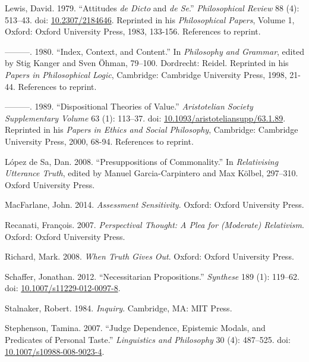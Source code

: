 \documentclass[
  10pt,
  letterpaper,
  DIV=11,
  numbers=noendperiod,
  twoside]{scrartcl}
\newlength{\cslhangindent}
\newenvironment{CSLReferences}[2] %
 {\begin{list}{}{%
  \setlength{\itemindent}{0pt}
  \setlength{\leftmargin}{0pt}
  \setlength{\parsep}{0pt}
  \ifodd #1
   \setlength{\leftmargin}{\cslhangindent}
   \setlength{\itemindent}{-1\cslhangindent}
  \fi
  \setlength{\itemsep}{#2\baselineskip}}}
 {\end{list}}
\begin{document}
\begin{CSLReferences}{1}{0}
Lewis, David. 1979. {``Attitudes \emph{de Dicto} and \emph{de Se}.''}
\emph{Philosophical Review} 88 (4): 513--43. doi:
\href{https://doi.org/10.2307/2184646}{10.2307/2184646}. Reprinted in
his \emph{Philosophical Papers}, Volume 1, Oxford: Oxford University
Press, 1983, 133-156. References to reprint.

---------. 1980. {``Index, Context, and Content.''} In \emph{Philosophy
and Grammar}, edited by Stig Kanger and Sven Öhman, 79--100. Dordrecht:
Reidel. Reprinted in his \emph{Papers in Philosophical Logic},
Cambridge: Cambridge University Press, 1998, 21-44. References to
reprint.

---------. 1989. {``Dispositional Theories of Value.''}
\emph{Aristotelian Society Supplementary Volume} 63 (1): 113--37. doi:
\href{https://doi.org/10.1093/aristoteliansupp/63.1.89}{10.1093/aristoteliansupp/63.1.89}.
Reprinted in his \emph{Papers in Ethics and Social Philosophy},
Cambridge: Cambridge University Press, 2000, 68-94. References to
reprint.

López de Sa, Dan. 2008. {``Presuppositions of Commonality.''} In
\emph{Relativising Utterance Truth}, edited by Manuel Garcia-Carpintero
and Max Kölbel, 297--310. Oxford University Press.

MacFarlane, John. 2014. \emph{Assessment Sensitivity}. Oxford: Oxford
University Press.

Recanati, François. 2007. \emph{Perspectival Thought: A Plea for
(Moderate) Relativism}. Oxford: Oxford University Press.

Richard, Mark. 2008. \emph{When Truth Gives Out}. Oxford: Oxford
University Press.

Schaffer, Jonathan. 2012. {``Necessitarian Propositions.''}
\emph{Synthese} 189 (1): 119--62. doi:
\href{https://doi.org/10.1007/s11229-012-0097-8}{10.1007/s11229-012-0097-8}.

Stalnaker, Robert. 1984. \emph{Inquiry}. Cambridge, MA: MIT Press.

Stephenson, Tamina. 2007. {``Judge Dependence, Epistemic Modals, and
Predicates of Personal Taste.''} \emph{Linguistics and Philosophy} 30
(4): 487--525. doi:
\href{https://doi.org/10.1007/s10988-008-9023-4}{10.1007/s10988-008-9023-4}.


\end{CSLReferences}
\end{document}
